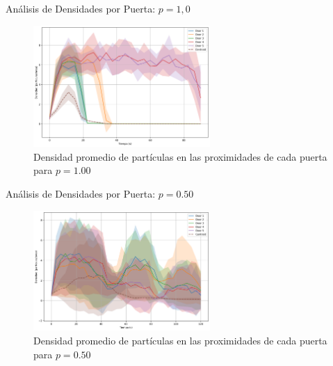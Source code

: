 \documentclass[aspectratio=169]{beamer}
\begin{document}

\begin{frame}{Análisis de Densidades por Puerta: $p = 1,0$}
    \begin{figure}[H]
        \centering
        \includegraphics[width=0.6\textwidth]{img/circular_density_t_20_&_p_1.00.png}
        \caption{Densidad promedio de partículas en las proximidades de cada puerta para $p=1.00$}
        \label{fig:densidad_p100}
    \end{figure}
\end{frame}
\begin{frame}{Análisis de Densidades por Puerta: $p = 0.50$}
    \begin{figure}[H]
        \centering
        \includegraphics[width=0.6\textwidth]{img/circular_density_t_20_&_p_0.50.png}
        \caption{Densidad promedio de partículas en las proximidades de cada puerta para $p=0.50$}
        \label{fig:densidad_p050}
    \end{figure}
\end{frame}
\end{document}
